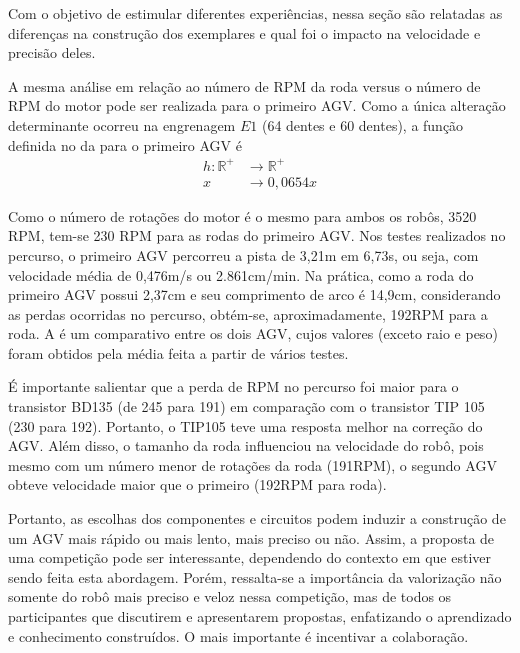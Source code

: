 \documentclass{textolivre}
\begin{document}
Com o objetivo de estimular diferentes experiências, nessa seção são relatadas
as diferenças na construção dos exemplares e qual foi o impacto na velocidade e
precisão deles.



A mesma análise em relação ao número de RPM da roda versus o número de RPM do
motor pode ser realizada para o primeiro AGV. Como a única alteração
determinante ocorreu na engrenagem $E1$ (64 dentes e 60 dentes), a função
definida no  da  para o primeiro AGV é 
\begin{align*}
h: \mathbb{R}^{+} &\rightarrow \mathbb{R}^{+} \\
  x &\rightarrow 0,0654 x \nonumber
\end{align*}

Como o número de rotações do motor é o mesmo para ambos os robôs, 3520 RPM,
tem-se 230 RPM para as rodas do primeiro AGV. Nos testes realizados no
percurso, o primeiro AGV percorreu a pista de 3,21m em 6,73s, ou seja, com
velocidade média de 0,476m/s ou 2.861cm/min. Na prática, como a roda do
primeiro AGV possui 2,37cm e seu comprimento de arco é 14,9cm, considerando as
perdas ocorridas no percurso, obtém-se, aproximadamente, 192RPM para a roda. A
 é um comparativo entre os dois AGV, cujos valores (exceto raio e peso)
foram obtidos pela média feita a partir de vários testes.



É importante salientar que a perda de RPM no percurso foi maior para o
transistor BD135 (de 245 para 191) em comparação com o transistor TIP 105 (230
para 192). Portanto, o TIP105 teve uma resposta melhor na correção do AGV. Além
disso, o tamanho da roda influenciou na velocidade do robô, pois mesmo com um
número menor de rotações da roda (191RPM), o segundo AGV obteve velocidade
maior que o primeiro (192RPM para roda).

Portanto, as escolhas dos componentes e circuitos podem induzir a construção de
um AGV mais rápido ou mais lento, mais preciso ou não. Assim, a proposta de uma
competição pode ser interessante, dependendo do contexto em que estiver sendo
feita esta abordagem. Porém, ressalta-se a importância da valorização não
somente do robô mais preciso e veloz nessa competição, mas de todos os
participantes que discutirem e apresentarem propostas, enfatizando o
aprendizado e conhecimento construídos. O mais importante é incentivar a
colaboração.
\end{document}
